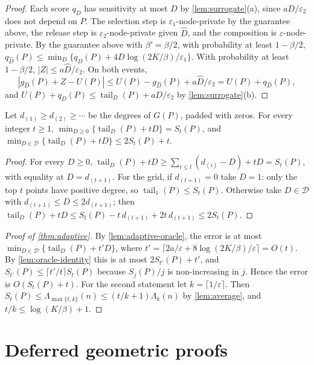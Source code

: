\documentclass[anonymous,a4paper,USenglish,cleveref,autoref,thm-restate]{socg-lipics-v2021}
\newcommand{\eps}{\varepsilon}
\newcommand{\Lam}{\Lambda}
\newcommand{\tail}{\operatorname{tail}}
\begin{document}
\begin{proof}
Each score $q_D$ has sensitivity at most $D$ by \cref{lem:surrogate}(a), since $aD/\eps_2$ does not depend on $P$. The selection step is $\eps_1$-node-private by the guarantee above, the release step is $\eps_2$-node-private given $\widehat D$, and the composition is $\eps$-node-private. By the guarantee above with $\beta'=\beta/2$, with probability at least $1-\beta/2$, $q_{\widehat D}(P)\le\min_D\{q_D(P)+4D\log(2K/\beta)/\eps_1\}$. With probability at least $1-\beta/2$, $|Z|\le a\widehat D/\eps_2$. On both events,
\[
  |g_{\widehat D}(P)+Z-U(P)|\le U(P)-g_{\widehat D}(P)+a\widehat D/\eps_2=U(P)+q_{\widehat D}(P),
\]
and $U(P)+q_D(P)\le\tail_D(P)+aD/\eps_2$ by \cref{lem:surrogate}(b).
\end{proof}

\begin{lemma}
\label{lem:oracle-identity}
Let $d_{(1)}\ge d_{(2)}\ge\cdots$ be the degrees of $G(P)$, padded with zeros. For every integer $t\ge1$, $\min_{D\ge0}\{\tail_D(P)+tD\}=S_t(P)$, and $\min_{D\in\mathcal D}\{\tail_D(P)+tD\}\le2S_t(P)+t$.
\end{lemma}

\begin{proof}
For every $D\ge0$, $\tail_D(P)+tD\ge\sum_{i\le t}(d_{(i)}-D)+tD=S_t(P)$, with equality at $D=d_{(t+1)}$. For the grid, if $d_{(t+1)}=0$ take $D=1$: only the top $t$ points have positive degree, so $\tail_1(P)\le S_t(P)$. Otherwise take $D\in\mathcal D$ with $d_{(t+1)}\le D\le2d_{(t+1)}$; then $\tail_D(P)+tD\le S_t(P)-t\,d_{(t+1)}+2t\,d_{(t+1)}\le2S_t(P)$.
\end{proof}

\begin{proof}[Proof of \cref{thm:adaptive}]
By \cref{lem:adaptive-oracle}, the error is at most $\min_{D\in\mathcal D}\{\tail_D(P)+t'D\}$, where $t'=\lceil 2a/\eps+8\log(2K/\beta)/\eps\rceil=O(t)$. By \cref{lem:oracle-identity} this is at most $2S_{t'}(P)+t'$, and $S_{t'}(P)\le\lceil t'/t\rceil S_t(P)$ because $S_j(P)/j$ is non-increasing in $j$. Hence the error is $O(S_t(P)+t)$. For the second statement let $k=\lceil1/\eps\rceil$. Then $S_t(P)\le\Lam_{\max\{t,k\}}(n)\le(t/k+1)\Lam_k(n)$ by \cref{lem:average}, and $t/k\le\log(K/\beta)+1$.
\end{proof}

\section{Deferred geometric proofs}
\label{app:geometry}
\end{document}
